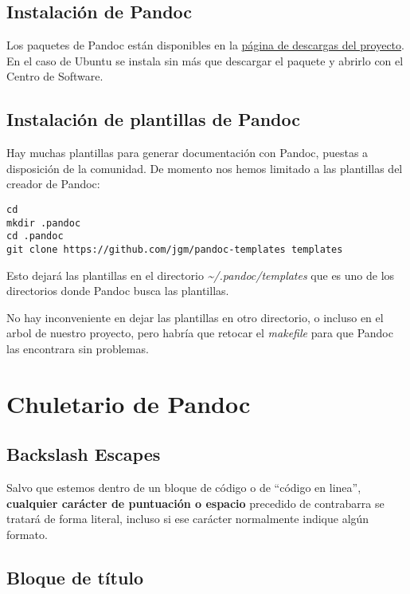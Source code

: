 \documentclass[12pt,spanish,]{article}
\begin{document}
\subsection{Instalación de Pandoc}\label{instalaciuxf3n-de-pandoc}

Los paquetes de Pandoc están disponibles en la
\href{http://pandoc.org/installing.html}{página de descargas del
proyecto}. En el caso de Ubuntu se instala sin más que descargar el
paquete y abrirlo con el Centro de Software.

\subsection{Instalación de plantillas de
Pandoc}\label{instalaciuxf3n-de-plantillas-de-pandoc}

Hay muchas plantillas para generar documentación con Pandoc, puestas a
disposición de la comunidad. De momento nos hemos limitado a las
plantillas del creador de Pandoc:

\begin{verbatim}
cd 
mkdir .pandoc
cd .pandoc
git clone https://github.com/jgm/pandoc-templates templates
\end{verbatim}

Esto dejará las plantillas en el directorio
\emph{\textasciitilde{}/.pandoc/templates} que es uno de los directorios
donde Pandoc busca las plantillas.

No hay inconveniente en dejar las plantillas en otro directorio, o
incluso en el arbol de nuestro proyecto, pero habría que retocar el
\emph{makefile} para que Pandoc las encontrara sin problemas.

\section{Chuletario de Pandoc}\label{chuletario-de-pandoc}

\subsection{Backslash Escapes}\label{backslash-escapes}

Salvo que estemos dentro de un bloque de código o de ``código en
linea'', \textbf{cualquier carácter de puntuación o espacio} precedido
de contrabarra se tratará de forma literal, incluso si ese carácter
normalmente indique algún formato.

\subsection{Bloque de título}\label{bloque-de-tuxedtulo}
\end{document}
